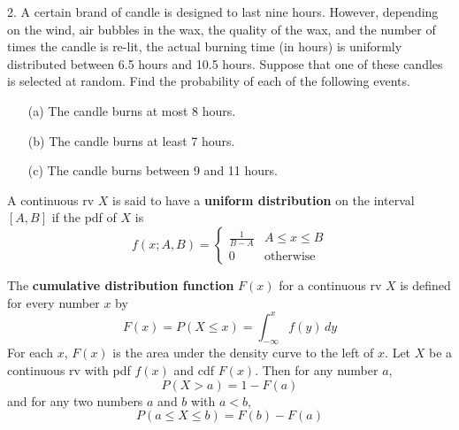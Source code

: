 \documentclass{report}
\begin{document}
 \pagebreak \bigbreak \noindent 
 \begin{mdframed}
     2. A certain brand of candle is designed to last nine hours. However, depending on the wind, air bubbles in the wax, the quality of the wax, and the number of times the candle is re-lit, the actual burning time (in hours) is uniformly distributed between 6.5 hours and 10.5 hours. Suppose that one of these candles is selected at random. Find the probability of each of the following events.
     \begin{enumerate}
         \item[(a)] The candle burns at most 8 hours.
         \item[(b)] The candle burns at least 7 hours.
         \item[(c)] The candle burns between 9 and 11 hours.
     \end{enumerate}
 \end{mdframed}
 \bigbreak \noindent 
 \begin{remark}
     A continuous rv $X$ is said to have a \textbf{uniform distribution} on the interval $[A, B]$ if the pdf of $X$ is
     \[
         f(x; A, B) = 
         \begin{cases} 
             \frac{1}{B - A} & A \leq x \leq B \\ 
             0 & \text{otherwise} 
         \end{cases}
     \]
 \end{remark}
 \bigbreak \noindent 
 The \textbf{cumulative distribution function} $F(x)$ for a continuous rv $X$ is defined for every number $x$ by
 \[
     F(x) = P(X \leq x) = \int_{-\infty}^{x} f(y) \, dy
 \]
 For each $x$, $F(x)$ is the area under the density curve to the left of $x$. 
 \bigbreak \noindent 
 Let $X$ be a continuous rv with pdf $f(x)$ and cdf $F(x)$. Then for any number $a$,
 \[
     P(X > a) = 1 - F(a)
 \]
 and for any two numbers $a$ and $b$ with $a < b$,
 \[
     P(a \leq X \leq b) = F(b) - F(a)
 \] \smiley{}
\end{document}
